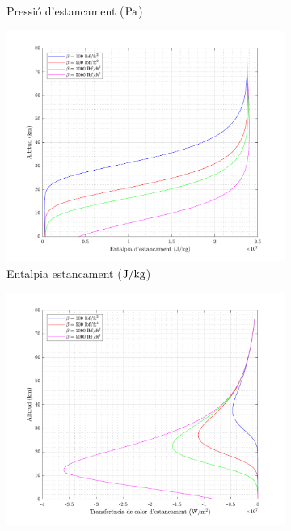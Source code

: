 \begin{figure}[ht]
\begin{subfigure}[t]{.33\textwidth}
        \captionsetup{skip=0pt}
        \caption{Pressió d'estancament ($\pascal$)}
    \end{subfigure}
        \begin{subfigure}[t]{.33\textwidth}
        \centering
        \includegraphics[width=\linewidth]{imagenes/01_ballistic_graficas/entalpia_estancament_no_title.pdf}
        \captionsetup{skip=0pt}
        \caption{Entalpia estancament ($\joule / \kilo\gram$)}
    \end{subfigure}%
    \begin{subfigure}[t]{.33\textwidth}
        \centering
        \includegraphics[width=\linewidth]{imagenes/01_ballistic_graficas/transferencia_calor_estancament_no_title.pdf}

\end{subfigure}
\end{figure}
